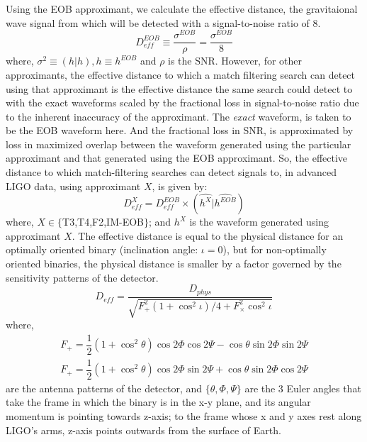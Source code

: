 \documentclass[aps,
prd,
amsmath,
amssymb,
twocolumn,
floatfix,
groupedaddress]{revtex4-1}
\def\l({\left(}
\def\r){\right)}
\begin{document}
Using the EOB approximant, we calculate the effective distance, the gravitaional wave signal from which will be detected with a signal-to-noise ratio of 8. 
\begin{equation}\label{eq:DeffEOB}
D^{EOB}_{eff} \equiv \dfrac{\sigma^{EOB}}{\rho} = \dfrac{\sigma^{EOB}}{8}
\end{equation}
where, $\sigma^2\equiv\l(h|h\r),h\equiv h^{EOB}$ and $\rho$ is the SNR. However, for other approximants, the effective distance to which a match filtering search can detect using that approximant is the effective distance the same search could detect to with the exact waveforms scaled by the fractional loss in signal-to-noise ratio due to the inherent inaccuracy of the approximant. The \textit{exact} waveform, is taken to be the EOB waveform here. And the fractional loss in SNR, is approximated by loss in maximized overlap between the waveform generated using the particular approximant and that generated using the EOB approximant. So, the effective distance to which match-filtering searches can detect signals to, in advanced LIGO data, using approximant $X$, is given by: 
\begin{equation}\label{eq:DeffPN}
D^X_{eff} = D^{EOB}_{eff} \times \l(\hat{h^X}|\hat{h^{EOB}}\r)
\end{equation}
where, $X\in\{$T3,T4,F2,IM-EOB$\}$; and $h^X$ is the waveform generated using approximant $X$. The effective distance is equal to the physical distance for an optimally oriented binary (inclination angle: $\iota = 0$), but for non-optimally oriented binaries, the physical distance is smaller by a factor governed by the sensitivity patterns of the detector.
\begin{equation}
D_{eff} = \dfrac{D_{phys}}{\sqrt{F^2_+\l(1+\cos^2\iota\r)/4 + F^2_{\times}\cos^2\iota}}
\end{equation}
where, 
\begin{align*}\nonumber
F_+ = \dfrac{1}{2}(1+\cos^2\theta)\cos2\Phi \cos2\Psi - \cos\theta \sin2\Phi \sin2\Psi\\
F_+ = \dfrac{1}{2}(1+\cos^2\theta)\cos2\Phi \sin2\Psi + \cos\theta \sin2\Phi \cos2\Psi
\end{align*}
are the antenna patterns of the detector\citep{SathyaSchutzLRR}, and $\{\theta,\Phi,\Psi\}$ are the 3 Euler angles that take the frame in which the binary is in the x-y plane, and its angular momentum is pointing towards z-axis; to the frame whose x and y axes rest along LIGO's arms, z-axis points outwards from the surface of Earth.
\end{document}

